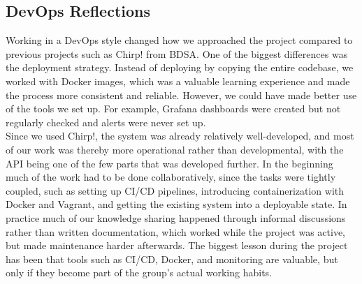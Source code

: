 \subsection{DevOps Reflections}
Working in a DevOps style changed how we approached the project compared to previous projects  such as Chirp! from BDSA. One of the biggest differences was the deployment strategy. Instead of deploying by copying the entire codebase, we worked with Docker images, which was a valuable learning experience and made the process more consistent and reliable. However, we could have made better use of the tools we set up. For example, Grafana dashboards were created but not regularly checked and alerts were never set up.\\
Since we used Chirp!, the system was already relatively well-developed, and most of our work was thereby more operational rather than developmental, with the API being one of the few parts that was developed further. In the beginning much of the work had to be done collaboratively, since the tasks were tightly coupled, such as setting up CI/CD pipelines, introducing containerization with Docker and Vagrant, and getting the existing system into a deployable state. In practice much of our knowledge sharing happened through informal discussions rather than written documentation, which worked while the project was active, but made maintenance harder afterwards. The biggest lesson during the project has been that tools such as CI/CD, Docker, and monitoring are valuable, but only if they become part of the group’s actual working habits.
